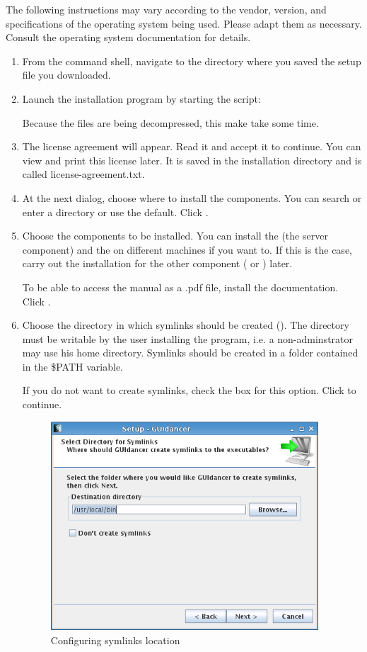

The following instructions may vary according to the vendor, version, and specifications of the operating system being used. Please adapt them as necessary. Consult the operating system documentation for details.

\begin{enumerate}
\item From the command shell, navigate to the directory where you saved the setup file you downloaded. 
\item Launch the installation program by starting the script:\\
  
Because the files are being decompressed, this make take some time.  
  \item The license agreement will appear. Read it and accept it to continue.  
You can view and print this license later. It is saved in the  installation directory and is called license-agreement.txt.   
\item At the next dialog, choose where to install the components. You can search or enter a directory or use the default. Click .

\item Choose the components to be installed.
You can install the \gdagent{} (the server component) and the \ite{} on different machines if you want to. If this is the case, carry out the installation for the other component (\ite{} or \gdagent{}) later. 

To be able to access the manual as a .pdf file, install the  documentation. Click .


\item Choose the directory in which symlinks  should be created (). The directory must be writable by the user installing the program, i.e. a non-adminstrator may use his home directory. Symlinks should be created in a folder contained in  the \$PATH variable.

If you do not want to create symlinks, check the box for this option. Click  to continue.  

  \begin{center}
  \begin{figure}[h]
    \includegraphics[width=10cm]{Windows/PS/symlinks}
    \caption{Configuring symlinks location}
    \label{figSymlinks}
  \end{figure}
  \end{center}


\end{enumerate}
